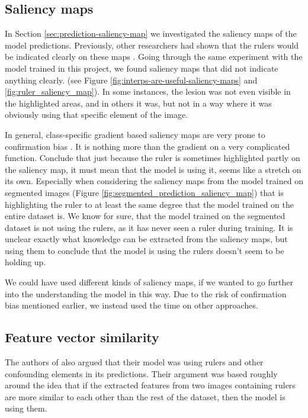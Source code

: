 \subsection{Saliency maps}
In Section \ref{sec:prediction-saliency-map} we investigated the saliency maps of the model predictions.
Previously, other researchers had shown that the rulers would be indicated clearly on these maps \cite{interps-are-useful}.
Going through the same experiment with the model trained in this project, we found saliency maps that did not indicate anything clearly. 
(see Figure \ref{fig:interps-are-useful-saliency-maps} and \ref{fig:ruler_saliency_map}).
In some instances, the lesion was not even visible in the highlighted areas,
and in others it was, but not in a way where it was obviously using that specific element of the image.

In general, class-specific gradient based saliency maps are very prone to confirmation bias \cite{sanity-checks-for-saliency,Grns2020FaithfulSM}.
It is nothing more than the gradient on a very complicated function.
Conclude that just because the ruler is sometimes highlighted partly on the saliency map,
it must mean that the model is using it, seems like a stretch on its own.
Especially when considering the saliency maps from the model trained on segmented images (Figure 
\ref{fig:segmented_prediction_saliency_map}) that is highlighting the ruler to at least the same degree 
that the model trained on the entire dataset is.
We know for sure, that the model trained on the segmented dataset is not using the rulers,
as it has never seen a ruler during training.
It is unclear exactly what knowledge can be extracted from the saliency maps,
but using them to conclude that the model is using the rulers doesn't seem to be holding up.

We could have used different kinds of saliency maps, if we wanted to go further into the understanding 
the model in this way.
Due to the risk of confirmation bias mentioned earlier, we instead used the time on other approaches.

\subsection{Feature vector similarity}
The authors of \cite{debias-not-so-fast} also argued that their model was using rulers
and other confounding elements in its predictions.
Their argument was based roughly around the idea that if the extracted features from two images
containing rulers are more similar to each other than the rest of the dataset, then the model is using them.

